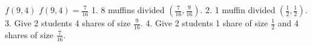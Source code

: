$f(9,4)$
$f(9,4)=\frac{7}{16}$
1. 8 muffins divided $(\frac{7}{16}, \frac{9}{16})$.
2. 1 muffin divided $(\frac{1}{2}, \frac{1}{2})$.
3. Give 2 students 4 shares of size $\frac{9}{16}$.
4. Give 2 students 1 share of size $\frac{1}{2}$ and 4 shares of size $\frac{7}{16}$.